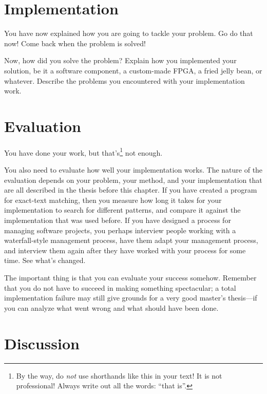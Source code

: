 \documentclass[12pt,a4paper,oneside,pdftex]{report}
\begin{document}
% 

\chapter{Implementation}
\label{chapter:implementation}

You have now explained how you are going to tackle your problem.
Go do that now! Come back when the problem is solved!

Now, how did you solve the problem?
Explain how you implemented your solution, be it a software component, a
custom-made FPGA, a fried jelly bean, or whatever.
Describe the problems you encountered with your implementation work.



% 

\chapter{Evaluation}
\label{chapter:evaluation}

You have done your work, but that's\footnote{By the way, do \emph{not} use
shorthands like this in your text! It is not professional! Always write out all
the words: ``that is''.} not enough.

You also need to evaluate how well your implementation works.  The
nature of the evaluation depends on your problem, your method, and
your implementation that are all described in the thesis before this
chapter.  If you have created a program for exact-text matching, then
you measure how long it takes for your implementation to search for
different patterns, and compare it against the implementation that was
used before.  If you have designed a process for managing software
projects, you perhaps interview people working with a waterfall-style
management process, have them adapt your management process, and
interview them again after they have worked with your process for some
time. See what's changed.

The important thing is that you can evaluate your success somehow.
Remember that you do not have to succeed in making something spectacular; a
total implementation failure may still give grounds for a very good master's
thesis---if you can analyze what went wrong and what should have been done.




% 

\chapter{Discussion}
\label{chapter:discussion}
\end{document}
